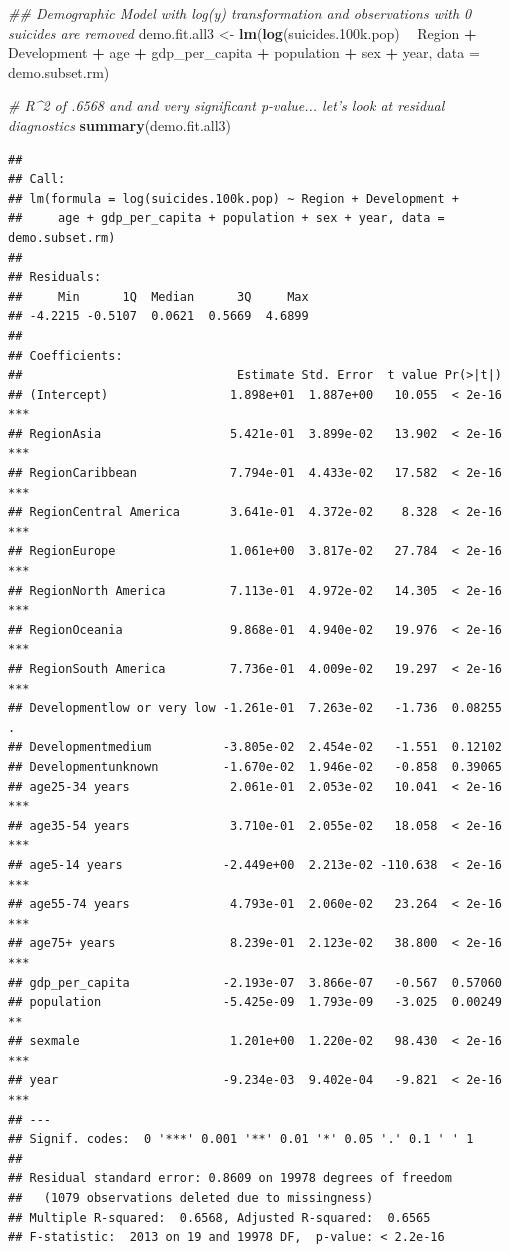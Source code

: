 \documentclass[11pt,]{article}
\newenvironment{Shaded}{\begin{snugshade}}{\end{snugshade}}
\newcommand{\CommentTok}[1]{\textcolor[rgb]{0.56,0.35,0.01}{\textit{#1}}}
\newcommand{\DataTypeTok}[1]{\textcolor[rgb]{0.13,0.29,0.53}{#1}}
\newcommand{\FloatTok}[1]{\textcolor[rgb]{0.00,0.00,0.81}{#1}}
\newcommand{\KeywordTok}[1]{\textcolor[rgb]{0.13,0.29,0.53}{\textbf{#1}}}
\newcommand{\NormalTok}[1]{#1}
\newcommand{\OperatorTok}[1]{\textcolor[rgb]{0.81,0.36,0.00}{\textbf{#1}}}
\newcommand{\StringTok}[1]{\textcolor[rgb]{0.31,0.60,0.02}{#1}}
\begin{document}
\begin{Shaded}
\begin{Highlighting}[]
\CommentTok{## Demographic Model with log(y) transformation and observations with 0 suicides are removed}
\NormalTok{demo.fit.all3 <-}\StringTok{ }\KeywordTok{lm}\NormalTok{(}\KeywordTok{log}\NormalTok{(suicides}\FloatTok{.100}\NormalTok{k.pop) }\OperatorTok{~}\StringTok{ }\NormalTok{Region }\OperatorTok{+}\StringTok{ }\NormalTok{Development }\OperatorTok{+}\StringTok{ }\NormalTok{age }\OperatorTok{+}\StringTok{ }\NormalTok{gdp_per_capita }\OperatorTok{+}\StringTok{ }\NormalTok{population }\OperatorTok{+}\StringTok{ }\NormalTok{sex }\OperatorTok{+}\StringTok{ }\NormalTok{year, }\DataTypeTok{data =}\NormalTok{ demo.subset.rm)}

\CommentTok{# R^2 of .6568 and and very significant p-value... let's look at residual diagnostics}
\KeywordTok{summary}\NormalTok{(demo.fit.all3)}
\end{Highlighting}
\end{Shaded}

\begin{verbatim}
## 
## Call:
## lm(formula = log(suicides.100k.pop) ~ Region + Development + 
##     age + gdp_per_capita + population + sex + year, data = demo.subset.rm)
## 
## Residuals:
##     Min      1Q  Median      3Q     Max 
## -4.2215 -0.5107  0.0621  0.5669  4.6899 
## 
## Coefficients:
##                              Estimate Std. Error  t value Pr(>|t|)    
## (Intercept)                 1.898e+01  1.887e+00   10.055  < 2e-16 ***
## RegionAsia                  5.421e-01  3.899e-02   13.902  < 2e-16 ***
## RegionCaribbean             7.794e-01  4.433e-02   17.582  < 2e-16 ***
## RegionCentral America       3.641e-01  4.372e-02    8.328  < 2e-16 ***
## RegionEurope                1.061e+00  3.817e-02   27.784  < 2e-16 ***
## RegionNorth America         7.113e-01  4.972e-02   14.305  < 2e-16 ***
## RegionOceania               9.868e-01  4.940e-02   19.976  < 2e-16 ***
## RegionSouth America         7.736e-01  4.009e-02   19.297  < 2e-16 ***
## Developmentlow or very low -1.261e-01  7.263e-02   -1.736  0.08255 .  
## Developmentmedium          -3.805e-02  2.454e-02   -1.551  0.12102    
## Developmentunknown         -1.670e-02  1.946e-02   -0.858  0.39065    
## age25-34 years              2.061e-01  2.053e-02   10.041  < 2e-16 ***
## age35-54 years              3.710e-01  2.055e-02   18.058  < 2e-16 ***
## age5-14 years              -2.449e+00  2.213e-02 -110.638  < 2e-16 ***
## age55-74 years              4.793e-01  2.060e-02   23.264  < 2e-16 ***
## age75+ years                8.239e-01  2.123e-02   38.800  < 2e-16 ***
## gdp_per_capita             -2.193e-07  3.866e-07   -0.567  0.57060    
## population                 -5.425e-09  1.793e-09   -3.025  0.00249 ** 
## sexmale                     1.201e+00  1.220e-02   98.430  < 2e-16 ***
## year                       -9.234e-03  9.402e-04   -9.821  < 2e-16 ***
## ---
## Signif. codes:  0 '***' 0.001 '**' 0.01 '*' 0.05 '.' 0.1 ' ' 1
## 
## Residual standard error: 0.8609 on 19978 degrees of freedom
##   (1079 observations deleted due to missingness)
## Multiple R-squared:  0.6568, Adjusted R-squared:  0.6565 
## F-statistic:  2013 on 19 and 19978 DF,  p-value: < 2.2e-16
\end{verbatim}
\end{document}
